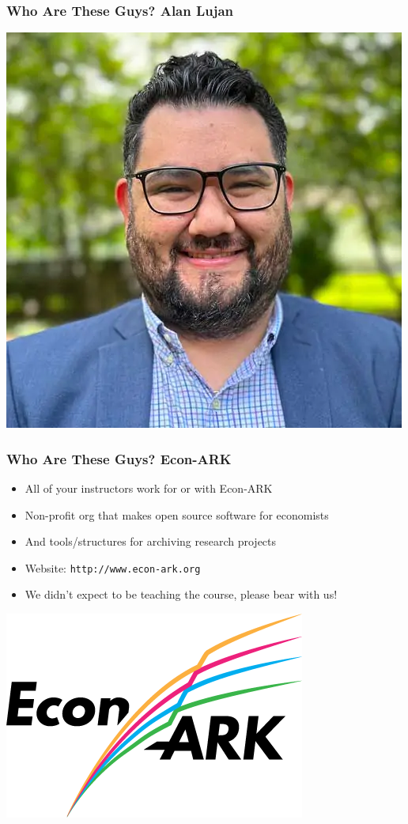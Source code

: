 \documentclass[aspectratio=169]{beamer}
\begin{document}
\begin{frame}
\frametitle{Who Are These Guys? Alan Lujan}
\centering
\includegraphics[scale=0.5]{../../media/alan-lujan.png}
\end{frame}

\begin{frame}
\frametitle{Who Are These Guys? Econ-ARK}
\begin{itemize}
	\item All of your instructors work for or with Econ-ARK
	
	\item Non-profit org that makes open source software for economists
	
	\item And tools/structures for archiving research projects
	
	\item Website: \texttt{http://www.econ-ark.org}
	
	\item We didn't expect to be teaching the course, please bear with us!
\end{itemize}

\centering
\includegraphics[scale=0.5]{../../media/econ-ark-logo.png}
\end{frame}
\end{document}
